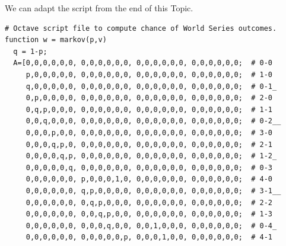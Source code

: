 \begin{exercises}
\begin{answer}
\begin{center}
     \end{center}
     \begin{exparts}
      \partsitem We can adapt the script from the end of this Topic.
\begin{lstlisting}
# Octave script file to compute chance of World Series outcomes.
function w = markov(p,v)
  q = 1-p;
  A=[0,0,0,0,0,0, 0,0,0,0,0,0, 0,0,0,0,0,0, 0,0,0,0,0,0;  # 0-0
     p,0,0,0,0,0, 0,0,0,0,0,0, 0,0,0,0,0,0, 0,0,0,0,0,0;  # 1-0
     q,0,0,0,0,0, 0,0,0,0,0,0, 0,0,0,0,0,0, 0,0,0,0,0,0;  # 0-1_
     0,p,0,0,0,0, 0,0,0,0,0,0, 0,0,0,0,0,0, 0,0,0,0,0,0;  # 2-0
     0,q,p,0,0,0, 0,0,0,0,0,0, 0,0,0,0,0,0, 0,0,0,0,0,0;  # 1-1
     0,0,q,0,0,0, 0,0,0,0,0,0, 0,0,0,0,0,0, 0,0,0,0,0,0;  # 0-2__
     0,0,0,p,0,0, 0,0,0,0,0,0, 0,0,0,0,0,0, 0,0,0,0,0,0;  # 3-0
     0,0,0,q,p,0, 0,0,0,0,0,0, 0,0,0,0,0,0, 0,0,0,0,0,0;  # 2-1
     0,0,0,0,q,p, 0,0,0,0,0,0, 0,0,0,0,0,0, 0,0,0,0,0,0;  # 1-2_
     0,0,0,0,0,q, 0,0,0,0,0,0, 0,0,0,0,0,0, 0,0,0,0,0,0;  # 0-3
     0,0,0,0,0,0, p,0,0,0,1,0, 0,0,0,0,0,0, 0,0,0,0,0,0;  # 4-0
     0,0,0,0,0,0, q,p,0,0,0,0, 0,0,0,0,0,0, 0,0,0,0,0,0;  # 3-1__
     0,0,0,0,0,0, 0,q,p,0,0,0, 0,0,0,0,0,0, 0,0,0,0,0,0;  # 2-2
     0,0,0,0,0,0, 0,0,q,p,0,0, 0,0,0,0,0,0, 0,0,0,0,0,0;  # 1-3
     0,0,0,0,0,0, 0,0,0,q,0,0, 0,0,1,0,0,0, 0,0,0,0,0,0;  # 0-4_
     0,0,0,0,0,0, 0,0,0,0,0,p, 0,0,0,1,0,0, 0,0,0,0,0,0;  # 4-1

\end{lstlisting}
\end{exparts}
\end{answer}
\end{exercises}

